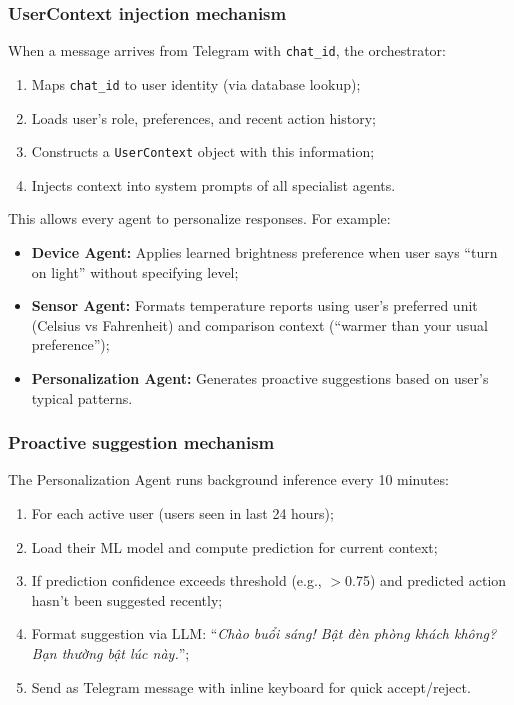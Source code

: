 \subsubsection{UserContext injection mechanism}

When a message arrives from Telegram with \texttt{chat\_id}, the
orchestrator:
\begin{enumerate}
    \item Maps \texttt{chat\_id} to user identity (via database lookup);
    \item Loads user's role, preferences, and recent action history;
    \item Constructs a \texttt{UserContext} object with this information;
    \item Injects context into system prompts of all specialist agents.
\end{enumerate}

This allows every agent to personalize responses. For example:
\begin{itemize}
    \item \textbf{Device Agent:} Applies learned brightness preference when
    user says ``turn on light'' without specifying level;
    \item \textbf{Sensor Agent:} Formats temperature reports using user's
    preferred unit (Celsius vs Fahrenheit) and comparison context
    (``warmer than your usual preference'');
    \item \textbf{Personalization Agent:} Generates proactive suggestions
    based on user's typical patterns.
\end{itemize}

\subsubsection{Proactive suggestion mechanism}

The Personalization Agent runs background inference every 10 minutes:
\begin{enumerate}
    \item For each active user (users seen in last 24 hours);
    \item Load their ML model and compute prediction for current context;
    \item If prediction confidence exceeds threshold (e.g., $>$0.75) and
    predicted action hasn't been suggested recently;
    \item Format suggestion via LLM: ``\emph{Chào buổi sáng! Bật đèn phòng
    khách không? Bạn thường bật lúc này.}'';
    \item Send as Telegram message with inline keyboard for quick accept/reject.
\end{enumerate}

